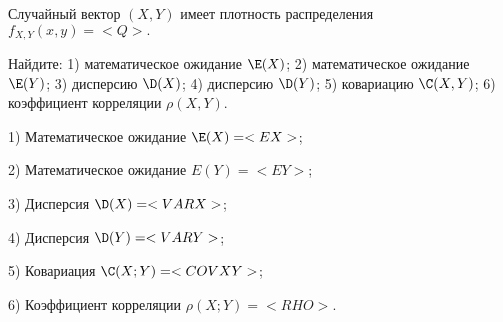\documentclass{article}%
\begin{document}
\begin{problem}
Случайный вектор $(X,Y)$
имеет плотность распределения
$
f_{X,Y}(x,y)=<Q>.\quad
$

Найдите:
1) математическое ожидание $\E(X)$;
2) математическое ожидание $\E(Y)$;
3) дисперсию $\D(X)$;
4) дисперсию $\D(Y)$;
5) ковариацию $\C(X,Y)$;
6) коэффициент корреляции $\rho(X,Y)$.
\end{problem}

\begin{solution*}
1) Математическое ожидание $\E(X) = <EX>$;

2) Математическое ожидание $E(Y) = <EY>$;

3) Дисперсия $\D(X) = <VARX>$;

4) Дисперсия $\D(Y) = <VARY>$;

5) Ковариация $\C(X;Y)= <COVXY>$;

6) Коэффициент корреляции $\rho(X;Y)  = <RHO>$.
\end{solution*}
\end{document}
